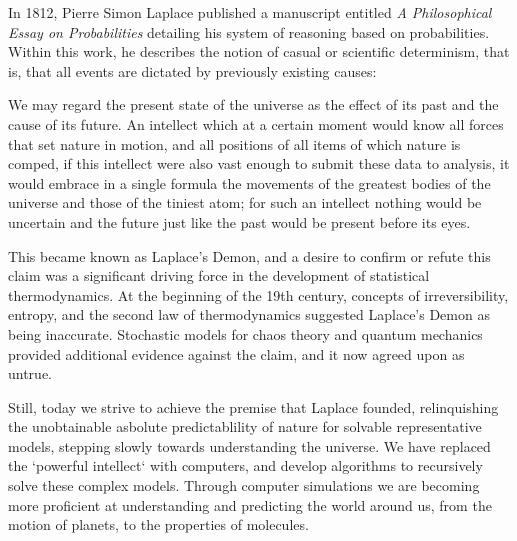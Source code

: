 In 1812, Pierre Simon Laplace published a manuscript entitled
\textit{A Philosophical Essay on Probabilities} detailing his system
of reasoning based on probabilities.\cite{Laplace1902} Within this
work, he describes the notion of casual or scientific determinism,
that is, that all events are dictated by previously existing causes:
 
\begin{displayquote}
We may regard the present state of the universe as the effect of
its past and the cause of its future. An intellect which at a certain
moment would know all forces that set nature in motion, and all
positions of all items of which nature is comped, if this intellect
were also vast enough to submit these data to analysis, it would
embrace in a single formula the movements of the greatest bodies of
the universe and those of the tiniest atom; for such an intellect
nothing would be uncertain and the future just like the past would be
present before its eyes.
\end{displayquote}

This became known as Laplace's Demon, and a desire to confirm or
refute this claim was a significant driving force in the development
of statistical thermodynamics.  At the beginning of the 19th century,
concepts of irreversibility, entropy, and the second law of
thermodynamics suggested Laplace's Demon as being inaccurate.
Stochastic models for chaos theory and quantum mechanics provided
additional evidence against the claim, and it now agreed upon as
untrue.

Still, today we strive to achieve the premise that Laplace founded,
relinquishing the unobtainable asbolute predictablility of nature for
solvable representative models, stepping slowly towards understanding
the universe. We have replaced the `powerful intellect` with
computers, and develop algorithms to recursively solve these
complex models. Through computer simulations we are becoming more
proficient at understanding and predicting the world around us, from
the motion of planets, to the properties of molecules.

